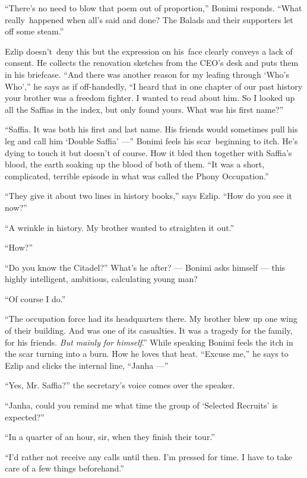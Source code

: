 \documentclass[twoside,11pt,openany]{book}
\begin{document}
``There's no need to blow that poem out of proportion,'' Bonimi responds. ``What
really~happened when all's said and done? The Balads and their supporters let off some steam.''

Ezlip doesn't~deny this but the expression on his~face clearly conveys a lack of consent. He collects the renovation
sketches from the CEO's desk and puts them in his briefcase. ``And there was another reason for my leafing
through `Who's Who','' he says as if off-handedly, ``I heard that in one chapter of our
past history your brother was a freedom fighter. I wanted to read about him. So I looked up all the Saffias in the
index, but only found yours. What was his first name?''

``Saffia. It was both his first and last name. His friends would sometimes pull his leg and call him
`Double Saffia' ---'' Bonimi feels his scar~beginning to itch. He's dying to touch it but doesn't of course.
How it bled then together with Saffia's blood, the earth soaking up the blood of both of them. ``It was a
short, complicated, terrible episode in what was called the Phony Occupation.''

``They give it about two lines in history books,'' says Ezlip. ``How do you see
it now?''

``A wrinkle in history. My brother wanted to straighten it out.''

``How?''

``Do you know the Citadel?'' What's he after? --- Bonimi asks himself --- this highly intelligent,
ambitious, calculating young man?

``Of course I do.''

``The occupation force had its headquarters there. My brother blew up one wing of their building. And was
one of its casualties. It was a tragedy for the family, for his friends. \textit{But mainly} \textit{for
himself}.''  While speaking Bonimi feels the itch in the scar turning into a burn. How he loves that
heat. ``Excuse me,'' he says to Ezlip and clicks the internal line, ``Janha ---''

``Yes, Mr. Saffia?'' the secretary's voice comes over the speaker.

``Janha, could you remind me what time the group of `Selected Recruits' is
expected?''

``In a quarter of an hour, sir, when they finish their tour.''

``I'd rather not receive any calls until then. I'm pressed for time. I have to take care of a few things
beforehand.''
\end{document}
